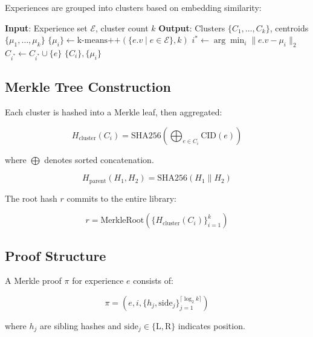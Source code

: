 \documentclass[11pt,letterpaper]{article}
\begin{document}
Experiences are grouped into clusters based on embedding similarity:

\begin{algorithm}[t]
\caption{Semantic Cluster Construction}
\label{alg:cluster}
\begin{algorithmic}[1]
\STATE \textbf{Input}: Experience set $\mathcal{E}$, cluster count $k$
\STATE \textbf{Output}: Clusters $\{C_1, \ldots, C_k\}$, centroids $\{\mu_1, \ldots, \mu_k\}$
\STATE $\{\mu_i\} \leftarrow \text{k-means++}(\{e.v \mid e \in \mathcal{E}\}, k)$
    \STATE $i^* \leftarrow \arg\min_i \|e.v - \mu_i\|_2$
    \STATE $C_{i^*} \leftarrow C_{i^*} \cup \{e\}$
\ENDFOR
\RETURN $\{C_i\}, \{\mu_i\}$
\end{algorithmic}
\end{algorithm}

\subsection{Merkle Tree Construction}

Each cluster is hashed into a Merkle leaf, then aggregated:

\begin{equation}
H_{\text{cluster}}(C_i) = \text{SHA256}\left(\bigoplus_{e \in C_i} \text{CID}(e)\right)
\end{equation}

where $\bigoplus$ denotes sorted concatenation.

\begin{equation}
H_{\text{parent}}(H_1, H_2) = \text{SHA256}(H_1 \| H_2)
\end{equation}

The root hash $r$ commits to the entire library:

\begin{equation}
r = \text{MerkleRoot}(\{H_{\text{cluster}}(C_i)\}_{i=1}^k)
\end{equation}

\subsection{Proof Structure}

A Merkle proof $\pi$ for experience $e$ consists of:

\begin{equation}
\pi = (e, i, \{h_j, \text{side}_j\}_{j=1}^{\lceil \log_2 k \rceil})
\end{equation}

where $h_j$ are sibling hashes and $\text{side}_j \in \{\text{L}, \text{R}\}$ indicates position.
\end{document}

